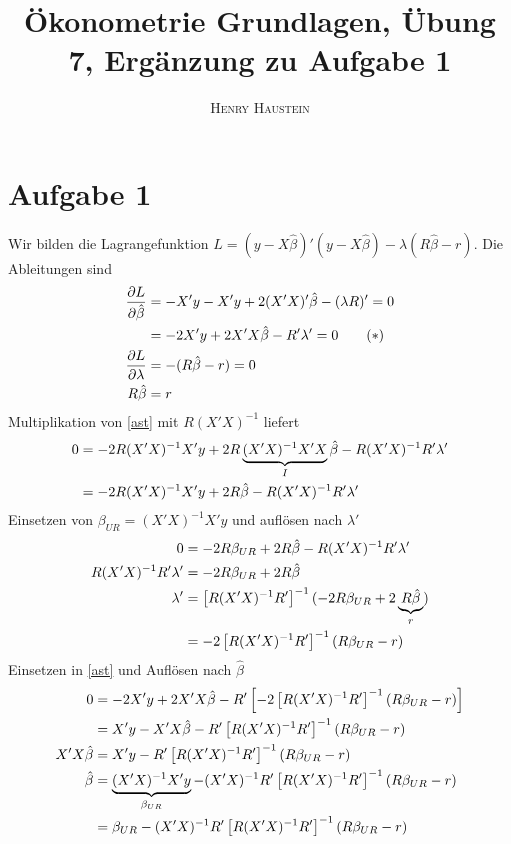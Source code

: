 \documentclass{article}
\title{\textbf{Ökonometrie Grundlagen, Übung 7, Ergänzung zu Aufgabe 1}}
\author{\textsc{Henry Haustein}}
\date{}
\begin{document}
	\maketitle
	
	\section*{Aufgabe 1}
	Wir bilden die Lagrangefunktion $L=(y-X\hat{\beta})'(y-X\hat{\beta}) - \lambda(R\hat{\beta}-r)$. Die Ableitungen sind
	\begin{align}
		\frac{\partial L}{\partial \hat{\beta}} &= -X'y - X'y + 2(X'X)'\hat{\beta} - (\lambda R)' = 0 \notag \\
		\label{ast}
		&= -2X'y + 2X'X\hat{\beta} - R'\lambda' = 0 \tag{\textasteriskcentered} \\
		\frac{\partial L}{\partial\lambda} &= -(R\hat{\beta}-r)=0 \notag \\
		R\hat{\beta} &= r \notag
	\end{align}
	Multiplikation von \eqref{ast} mit $R(X'X)^{-1}$ liefert
	\begin{align}
		0 &= -2R(X'X)^{-1}X'y + 2R\underbrace{(X'X)^{-1}X'X}_{I}\hat{\beta} - R(X'X)^{-1}R'\lambda' \notag \\
		&= -2R(X'X)^{-1}X'y + 2R\hat{\beta} - R(X'X)^{-1}R'\lambda' \notag
	\end{align}
	Einsetzen von $\beta_{UR} = (X'X)^{-1}X'y$ und auflösen nach $\lambda'$
	\begin{align}
		0 &= -2R\beta_{UR} + 2R\hat{\beta} - R(X'X)^{-1}R'\lambda' \notag \\
		R(X'X)^{-1}R'\lambda' &= -2R\beta_{UR} + 2R\hat{\beta} \notag \\
		\lambda' &= \left[R(X'X)^{-1}R'\right]^{-1}(-2R\beta_{UR} + 2\underbrace{R\hat{\beta}}_{r}) \notag \\
		&= -2\left[R(X'X)^{-1}R'\right]^{-1}(R\beta_{UR} - r) \notag
	\end{align}
	Einsetzen in \eqref{ast} und Auflösen nach $\hat{\beta}$
	\begin{align}
		0 &= -2X'y + 2X'X\hat{\beta} - R'\left[-2\left[R(X'X)^{-1}R'\right]^{-1}(R\beta_{UR} - r)\right] \notag \\
		&= X'y - X'X\hat{\beta} - R'\left[R(X'X)^{-1}R'\right]^{-1}(R\beta_{UR} - r) \notag \\
		X'X\hat{\beta} &= X'y - R'\left[R(X'X)^{-1}R'\right]^{-1}(R\beta_{UR} - r) \notag \\
		\hat{\beta} &= \underbrace{(X'X)^{-1}X'y}_{\beta_{UR}} - (X'X)^{-1}R'\left[R(X'X)^{-1}R'\right]^{-1}(R\beta_{UR} - r) \notag \\
		&= \beta_{UR} - (X'X)^{-1}R'\left[R(X'X)^{-1}R'\right]^{-1}(R\beta_{UR} - r) \notag
	\end{align}
	
\end{document}
